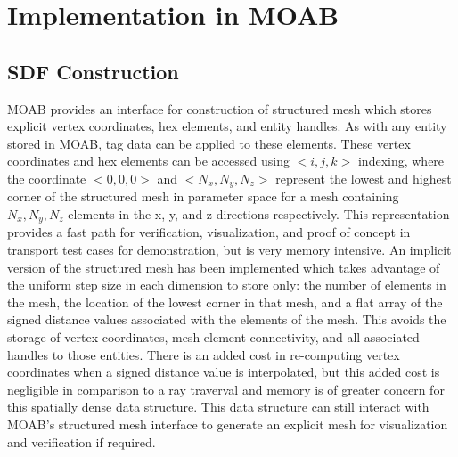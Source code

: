 \section{Implementation in MOAB}

\subsection{SDF Construction}

MOAB provides an interface for construction of structured mesh which stores
explicit vertex coordinates, hex elements, and entity handles. As with any
entity stored in MOAB, tag data can be applied to these elements. These vertex
coordinates and hex elements can be accessed using $<i,j,k>$ indexing, where the
coordinate $<0,0,0>$ and  $<N_{x}, N_{y}, N_{z}>$ represent the lowest and
highest corner of the structured mesh in
parameter space for a mesh containing $N_{x},N_{y},N_{z}$ elements in the x, y,
and z directions respectively. This representation provides
a fast path for verification, visualization, and proof of concept in transport
test cases for demonstration, but is very memory intensive. An implicit version
of the structured mesh has been implemented which takes advantage of the uniform
step size in each dimension to store only: the number of elements in the mesh,
the location of the lowest corner in that mesh, and a flat array of the signed
distance values associated with the elements of the mesh.
This avoids the storage of vertex coordinates, mesh element connectivity, and
all associated handles to those entities. There is an added cost in re-computing
vertex coordinates when a signed distance value is interpolated, but this added
cost is negligible in comparison to a ray traverval and memory is of greater
concern for this spatially dense data structure. This data structure can still
interact with MOAB's structured mesh interface to generate an explicit mesh for
visualization and verification if required.



